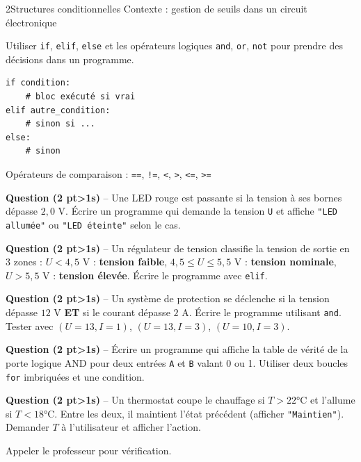 \documentclass[11pt,a4paper]{article}
\newcommand{\cadreblanc}[1]{%
  \medskip\framebox[\linewidth][c]{\rule{0mm}{#1mm}}\par\medskip}
\newcounter{qnum}
\newcommand{\resetq}{\setcounter{qnum}{0}}
\newcommand{\q}[2]{%
  \stepcounter{qnum}%
  \noindent\textbf{Question \theqnum{} \normalfont(#2 pt\ifnum#2>1s\fi)} -- #1\par\smallskip}
\begin{document}
\clearpage
\resetq
\begin{tptitre}{2}{Structures conditionnelles}
  Contexte : gestion de seuils dans un circuit électronique
\end{tptitre}

\begin{objectifbox}{}
  Utiliser \texttt{if}, \texttt{elif}, \texttt{else} et les opérateurs logiques \texttt{and}, \texttt{or}, \texttt{not} pour prendre des décisions dans un programme.
\end{objectifbox}

\begin{astucebox}
\begin{lstlisting}
if condition:
    # bloc exécuté si vrai
elif autre_condition:
    # sinon si ...
else:
    # sinon
\end{lstlisting}
Opérateurs de comparaison : \texttt{==}, \texttt{!=}, \texttt{<}, \texttt{>}, \texttt{<=}, \texttt{>=}
\end{astucebox}

\q{Une LED rouge est passante si la tension à ses bornes dépasse $2{,}0$ V. Écrire un programme qui demande la tension \texttt{U} et affiche \texttt{"LED allumée"} ou \texttt{"LED éteinte"} selon le cas.}{2}
\cadreblanc{24}

\q{Un régulateur de tension classifie la tension de sortie en 3 zones :
  $U < 4{,}5$ V : \textbf{tension faible},
  $4{,}5 \leq U \leq 5{,}5$ V : \textbf{tension nominale},
  $U > 5{,}5$ V : \textbf{tension élevée}.
  Écrire le programme avec \texttt{elif}.}{2}
\cadreblanc{26}

\q{Un système de protection se déclenche si la tension dépasse $12$ V \textbf{ET} si le courant dépasse $2$ A. Écrire le programme utilisant \texttt{and}. Tester avec $(U=13, I=1)$, $(U=13, I=3)$, $(U=10, I=3)$.}{2}
\cadreblanc{26}

\q{Écrire un programme qui affiche la table de vérité de la porte logique AND pour deux entrées \texttt{A} et \texttt{B} valant 0 ou 1. Utiliser deux boucles \texttt{for} imbriquées et une condition.}{2}
\cadreblanc{26}

\q{Un thermostat coupe le chauffage si $T > 22$°C et l'allume si $T < 18$°C. Entre les deux, il maintient l'état précédent (afficher \texttt{"Maintien"}). Demander $T$ à l'utilisateur et afficher l'action.}{2}
\cadreblanc{22}

\begin{appelbox}
  \centering Appeler le professeur pour vérification.
\end{appelbox}
\end{document}
